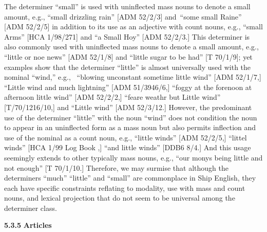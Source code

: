 The determiner “small” is used with uninflected mass nouns to denote a small amount, e.g., “small drizzling rain” [ADM 52/2/3] and~“some small Raine” [ADM 52/2/5] in addition to its use as an adjective with count nouns, e.g., “small Arms” [HCA 1/98/271] and “a Small Hoy” [ADM 52/2/3.] This determiner is also commonly used with uninflected mass nouns to denote a small amount, e.g., “little or noe news” [ADM 52/1/8] and “little sugar to be had” [T 70/1/9]; yet examples show that the determiner “little” is almost universally used with the nominal “wind,” e.g., ~“blowing unconstant sometime little wind” [ADM 52/1/7,] “Little wind and much lightning” [ADM 51/3946/6,] “foggy at the forenoon at afternoon little wind” [ADM 52/2/2,] “feare weathr but Little wind” [T/70/1216/10,] and “Little wind” [ADM 52/3/12.] However, the predominant use of the determiner “little” with the noun “wind” does not condition the noun to appear in an uninflected form as a mass noun but also permits inflection and use of the nominal as a count noun, e.g., “little winds” [ADM 52/2/5,] “littel winds” [HCA 1/99 Log Book \citealt{Pideaux1731},] “and little winds” [DDB6 8/4.] And this usage seemingly extends to other typically mass nouns, e.g., “our monys being little and not enough” [T 70/1/10.] Therefore, we may surmise that although the determiners “much” “little” and “small” are commonplace in Ship English, they each have specific constraints reflating to modality, use with mass and count nouns, and lexical projection that do not seem to be universal among the determiner class.  

\textbf{5.3.5} \textbf{Articles}


